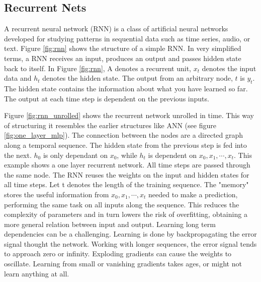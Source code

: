 \documentclass{article}
\begin{document}
\subsection{Recurrent Nets} \label{sec:reccurent_nets}

A recurrent neural network (RNN) is a class of artificial neural networks developed for studying patterns in sequential data such as time series, audio, or text. Figure \ref{fig:rnn} shows the structure of a simple RNN. In very simplified terms, a RNN receives an input, produces an output and passes hidden state back to itself. In Figure \ref{fig:rnn}, A denotes a recurrent unit, $x_t$ denotes the input data and  $h_t$ denotes the hidden state. The output from an arbitrary node, $t$ is $y_t$. %
The hidden state contains the information about what you have learned so far. The output at each time step is dependent on the previous inputs. 


Figure \ref{fig:rnn_unrolled} shows the recurrent network unrolled in time. This way of structuring it resembles the earlier structures like ANN (see figure \ref{fig:one_layer_mlp}). The connection between the nodes %
are a directed graph along a temporal sequence. The hidden state from the previous step is fed into the next. $h_0$ is only dependant on $x_0$, while $h_t$ is dependent on $x_0, x_1, \cdots, x_t $. This example shows a one layer recurrent network. All time steps are passed through the same node. The RNN reuses the weights on the input and hidden states for all time steps. Let t denotes the length of the training sequence. The "memory" stores the useful information from $x_0, x_1, \cdots, x_t $ needed to make a prediction, performing the same task on all inputs along the sequence. This reduces the complexity of parameters and in turn lowers the risk of overfitting, obtaining a more general relation between input and output.
Learning long term dependencies can be a challenging. Learning is done by backpropagating the error signal thought the network. Working with longer sequences, the error signal tends to approach zero or infinity. Exploding gradients can cause the weights to oscillate. Learning from small or vanishing gradients takes ages, or might not learn anything at all. 
\end{document}
